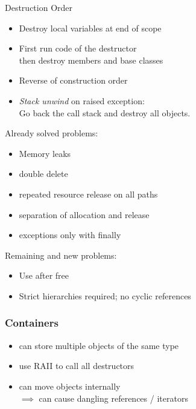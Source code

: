 \documentclass[xcolor=colortbl
]{beamer}
\begin{document}
\begin{frame}{Destruction Order}
    \begin{itemize}
        \item Destroy local variables at end of scope
        \item First run code of the destructor
        \\then destroy members and base classes
        \item Reverse of construction order
        \item
        \emph{Stack unwind} on raised exception: \\ Go back the call stack and destroy all objects.
    \end{itemize}
    
\end{frame}


\begin{frame}
    Already solved problems:
    \begin{itemize}
        \item Memory leaks
        \item double delete
        \item repeated resource release on all paths
        \item separation of allocation and release
        \item exceptions only with finally
    \end{itemize}
    
    Remaining and new problems:
    \begin{itemize}
        \item Use after free
        \item Strict hierarchies required; no cyclic references
    \end{itemize}
\end{frame}



\begin{frame}
    \frametitle{Containers}
    \begin{itemize}
        \item can store multiple objects of the same type
        \item use RAII to call all destructors
        \item can move objects internally
        \\ $\implies$ can cause dangling references / iterators
    \end{itemize} 
\end{frame}
\end{document}
